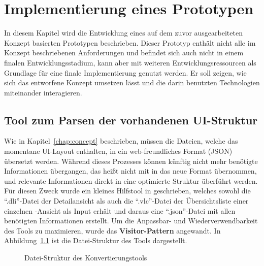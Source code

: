 \chapter{Implementierung eines Prototypen}\label{chap:implementation}
In diesem Kapitel wird die Entwicklung eines auf dem zuvor ausgearbeiteten Konzept basierten Prototypen beschrieben. Dieser Prototyp enthält nicht alle im Konzept beschriebenen Anforderungen und befindet sich auch nicht in einem finalen Entwicklungsstadium, kann aber mit weiteren Entwicklungsressourcen als Grundlage für eine finale Implementierung genutzt werden. Er soll zeigen, wie sich das entworfene Konzept umsetzen lässt und die darin benutzten Technologien miteinander interagieren.

\section{Tool zum Parsen der vorhandenen UI-Struktur}
Wie in Kapitel~\ref{chap:concept} beschrieben, müssen die Dateien, welche das momentane UI-Layout enthalten, in ein web-freundliches Format (JSON) übersetzt werden. Während dieses Prozesses können künftig nicht mehr benötigte Informationen übergangen, das heißt nicht mit in das neue Format übernommen, und relevante Informationen direkt in eine optimierte Struktur überführt werden. Für diesen Zweck wurde ein kleines Hilfstool in  geschrieben, welches sowohl die \enquote{.dli}-Datei der Detailansicht als auch die \enquote{.vlc}-Datei der Übersichtsliste einer einzelnen -Ansicht als Input erhält und daraus eine \enquote{.json}-Datei mit allen benötigten Informationen erstellt. Um die Anpassbar- und Wiederverwendbarkeit des Tools zu maximieren, wurde das \textbf{Visitor-Pattern} angewandt. In Abbildung~\ref{fig:web-conv_file-tree} ist die Datei-Struktur des Tools dargestellt.

\begin{figure}
    \centering
    \captionsetup{justification=centering}
        \caption{Datei-Struktur des Konvertierungstools}\label{fig:web-conv_file-tree}
\end{figure}

